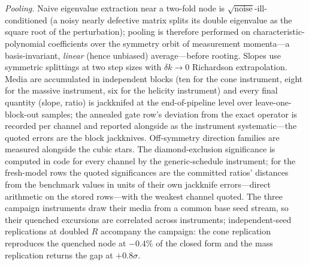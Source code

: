 \documentclass[aps,prd,twocolumn,superscriptaddress,nofootinbib,floatfix]{revtex4-2}
\begin{document}
\emph{Pooling.} Naive eigenvalue extraction near a two-fold node is
$\sqrt{\text{noise}}$-ill-conditioned (a noisy nearly defective matrix
splits its double eigenvalue as the square root of the perturbation);
pooling is therefore performed on characteristic-polynomial coefficients
over the symmetry orbit of measurement momenta---a basis-invariant,
\emph{linear} (hence unbiased) average---before rooting. Slopes use
symmetric splittings at two step sizes with $\delta k\to0$ Richardson
extrapolation. Media are accumulated in independent blocks (ten for the
cone instrument, eight for the massive instrument, six for the helicity
instrument) and every final quantity (slope, ratio) is jackknifed at the
end-of-pipeline level over leave-one-block-out samples; the annealed gate
row's deviation from the exact operator is recorded per channel and
reported alongside as the instrument systematic---the quoted errors are
the block jackknives. Off-symmetry direction families are measured alongside the
cubic stars. The diamond-exclusion significance is computed in code for
every channel by the generic-schedule instrument; for the fresh-model
rows the quoted significances are the committed ratios' distances from
the benchmark values in units of their own jackknife errors---direct
arithmetic on the stored rows---with the weakest channel quoted. The
three campaign instruments draw their media from a common base seed
stream, so their quenched excursions are correlated across
instruments; independent-seed replications at doubled $R$ accompany
the campaign: the cone replication reproduces the quenched node at
$-0.4\%$ of the closed form and the mass replication returns the gap
at $+0.8\sigma$.
\end{document}

